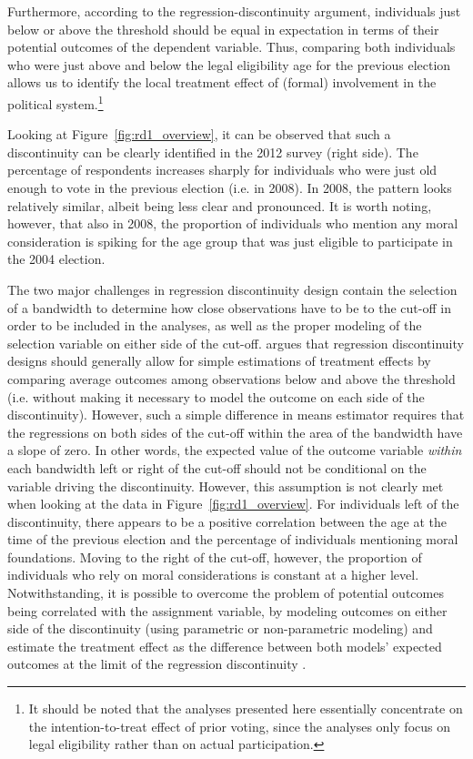 \documentclass[12pt]{article}
\begin{document}
Furthermore, according to the regression-discontinuity argument, individuals just below or above the threshold should be equal in expectation in terms of their potential outcomes of the dependent variable. Thus, comparing both individuals who were just above and below the legal eligibility age for the previous election allows us to identify the local treatment effect of (formal) involvement in the political system.\footnote{It should be noted that the analyses presented here essentially concentrate on the intention-to-treat effect of prior voting, since the analyses only focus on legal eligibility rather than on actual participation.}

Looking at Figure~\ref{fig:rd1_overview}, it can be observed that such a discontinuity can be clearly identified in the 2012 survey (right side). The percentage of respondents increases sharply for individuals who were just old enough to vote in the previous election (i.e. in 2008). In 2008, the pattern looks relatively similar, albeit being less clear and pronounced. It is worth noting, however, that also in 2008, the proportion of individuals who mention any moral consideration is spiking for the age group that was just eligible to participate in the 2004 election.

The two major challenges in regression discontinuity design contain the selection of a bandwidth to determine how close observations have to be to the cut-off in order to be included in the analyses, as well as the proper modeling of the selection variable on either side of the cut-off. \citet{dunning2012natural} argues that regression discontinuity designs should generally allow for simple estimations of treatment effects by comparing average outcomes among observations below and above the threshold (i.e. without making it necessary to model the outcome on each side of the discontinuity). However, such a simple difference in means estimator requires that the regressions on both sides of the cut-off within the area of the bandwidth have a slope of zero. In other words, the expected value of the outcome variable \textit{within} each bandwidth left or right of the cut-off should not be conditional on the variable driving the discontinuity. However, this assumption is not clearly met when looking at the data in Figure~\ref{fig:rd1_overview}. For individuals left of the discontinuity, there appears to be a positive correlation between the age at the time of the previous election and the percentage of individuals mentioning moral foundations. Moving to the right of the cut-off, however, the proportion of individuals who rely on moral considerations is constant at a higher level. Notwithstanding, it is possible to overcome the problem of potential outcomes being correlated with the assignment variable, by modeling outcomes on either side of the discontinuity (using parametric or non-parametric modeling) and estimate the treatment effect as the difference between both models' expected outcomes at the limit of the regression discontinuity \citet[see also][]{imbens2008regression}.
\end{document}
